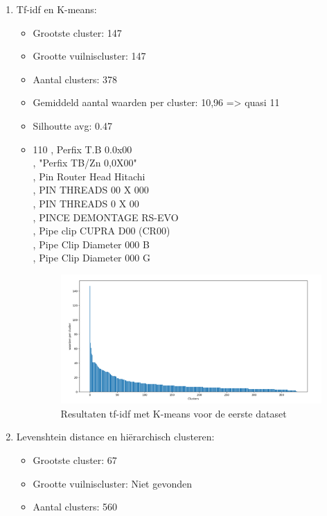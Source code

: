\begin{enumerate}
    \item Tf-idf en K-means:
    \begin{itemize}
        \item Grootste cluster: 147
        \item Grootte vuilniscluster: 147
        \item Aantal clusters: 378
        \item Gemiddeld aantal waarden per cluster: 10,96 => quasi 11
        \item Silhoutte avg: 0.47
        \item
        110 , Perfix T.B 0.0x00
        \\ , "Perfix TB/Zn 0,0X00"
        \\ , Pin Router Head Hitachi
        \\  , PIN THREADS 00 X 000
        \\  , PIN THREADS 0 X 00
        \\ , PINCE DEMONTAGE RS-EVO
        \\ , Pipe clip CUPRA D00 (CR00)
        \\  , Pipe Clip Diameter 000  B
        \\  , Pipe Clip Diameter 000  G
        \begin{figure}[h]
            \centering
            \includegraphics[width=0.7\linewidth]{../foto's/datakmeanstfidf}
            \caption{Resultaten tf-idf met K-means voor de eerste dataset}
            \label{fig:dataset1_kmeans_tfidf}
        \end{figure}
    \end{itemize}
\newpage
\item Levenshtein distance en hiërarchisch clusteren:
\begin{itemize}
    \item Grootste cluster: 67
    \item Grootte vuilniscluster: Niet gevonden
    \item Aantal clusters: 560

\end{itemize}
\end{enumerate}
